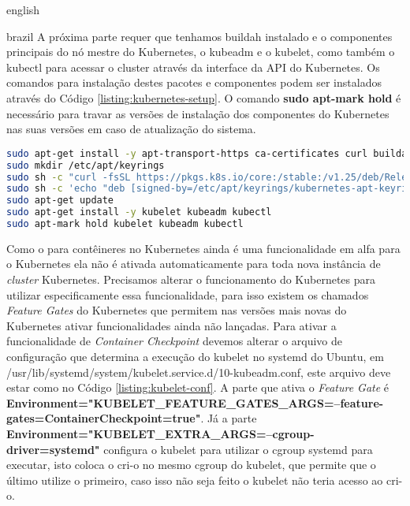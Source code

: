 \begin{otherlanguage*}{english}
\begin{otherlanguage*}{brazil}
A próxima parte requer que tenhamos buildah instalado e o componentes principais do nó
mestre do Kubernetes, o kubeadm e o kubelet, como também o kubectl para acessar o cluster
através da interface da API do Kubernetes. Os comandos para instalação destes pacotes e
componentes podem ser instalados através do Código \ref{listing:kubernetes-setup}. O comando
\textbf{sudo apt-mark hold} é necessário para travar as versões de instalação dos componentes
do Kubernetes nas suas versões em caso de atualização do sistema.

\begin{lstlisting}[language=bash,caption={Instalação dos pacotes necessários para Kubernetes e buildah.},label={listing:kubernetes-setup}]
sudo apt-get install -y apt-transport-https ca-certificates curl buildah make
sudo mkdir /etc/apt/keyrings
sudo sh -c "curl -fsSL https://pkgs.k8s.io/core:/stable:/v1.25/deb/Release.key | gpg --dearmor -o /etc/apt/keyrings/kubernetes-apt-keyring.gpg"
sudo sh -c 'echo "deb [signed-by=/etc/apt/keyrings/kubernetes-apt-keyring.gpg] https://pkgs.k8s.io/core:/stable:/v1.25/deb/ /" | tee /etc/apt/sources.list.d/kubernetes.list'
sudo apt-get update
sudo apt-get install -y kubelet kubeadm kubectl
sudo apt-mark hold kubelet kubeadm kubectl
\end{lstlisting}

Como o  para contêineres no Kubernetes ainda é uma funcionalidade em alfa para
o Kubernetes ela não é ativada automaticamente para toda nova instância de \textit{cluster}
Kubernetes. Precisamos alterar o funcionamento do Kubernetes para utilizar especificamente essa
funcionalidade, para isso existem os chamados \textit{Feature Gates} do Kubernetes que permitem
nas versões mais novas do Kubernetes ativar funcionalidades ainda não lançadas. Para ativar a
funcionalidade de \textit{Container Checkpoint} devemos alterar o arquivo de configuração que
determina a execução do kubelet no systemd do Ubuntu, em
/usr/lib/systemd/system/kubelet.service.d/10-kubeadm.conf, este arquivo deve estar como no
Código \ref{listing:kubelet-conf}. A parte que ativa o \textit{Feature Gate} é
\textbf{Environment="KUBELET\_FEATURE\_GATES\_ARGS=--feature-gates=ContainerCheckpoint=true"}. Já
a parte \textbf{Environment="KUBELET\_EXTRA\_ARGS=--cgroup-driver=systemd"} configura o kubelet
para utilizar o cgroup systemd para executar, isto coloca o cri-o no mesmo cgroup do kubelet, 
que permite que o último utilize o primeiro, caso isso não seja feito o kubelet não teria acesso
ao cri-o.


\end{otherlanguage*}
\end{otherlanguage*}

